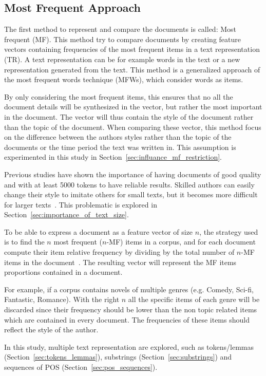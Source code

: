 \subsection{Most Frequent Approach}

The first method to represent and compare the documents is called: Most frequent (MF).
This method try to compare documents by creating feature vectors containing frequencies of the most frequent items in a text representation (TR).
A text representation can be for example words in the text or a new representation generated from the text.
This method is a generalized approach of the most frequent words technique (MFWs), which consider words as items.

By only considering the most frequent items, this ensures that no all the document details will be synthesized in the vector, but rather the most important in the document.
The vector will thus contain the style of the document rather than the topic of the document.
When comparing these vector, this method focus on the difference between the authors styles rather than the topic of the documents or the time period the text was written in.
This assumption is experimented in this study in Section~\ref{sec:influance_mf_restriction}.

Previous studies have shown the importance of having documents of good quality and with at least 5000 tokens to have reliable results.
Skilled authors can easily change their style to imitate others for small texts, but it becomes more difficult for larger texts~\cite{savoy_stylo}.
This problematic is explored in Section~\ref{sec:importance_of_text_size}.

To be able to express a document as a feature vector of size $n$, the strategy used is to find the $n$ most frequent ($n$-MF) items in a corpus, and for each document compute their item relative frequency by dividing by the total number of $n$-MF items in the document~\cite{savoy_stylo}.
The resulting vector will represent the MF items proportions contained in a document.

For example, if a corpus contains novels of multiple genres (e.g. Comedy, Sci-fi, Fantastic, Romance).
With the right $n$ all the specific items of each genre will be discarded since their frequency should be lower than the non topic related items which are contained in every document.
The frequencies of these items should reflect the style of the author.

In this study, multiple text representation are explored, such as tokens/lemmas (Section~\ref{sec:tokens_lemmas}), substrings (Section~\ref{sec:substrings}) and sequences of POS (Section~\ref{sec:pos_sequences}).

